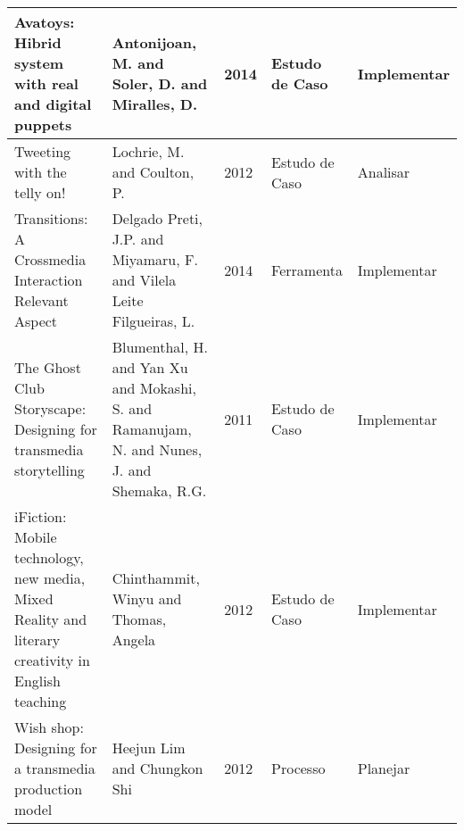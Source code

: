 \documentclass[
article,			%
11pt,				%
oneside,			%
a4paper,			%
english,			%
brazil,				%
sumario=tradicional
]{abntex2}
\begin{document}
\begin{anexosenv}
\begin{longtable}{p{6.0cm}|p{3.0cm}|p{.6cm}|p{2.0cm}|p{2.0cm}}
      \hline
      Avatoys: Hibrid system with real and digital puppets&Antonijoan, M. and Soler, D. and Miralles, D.&2014&Estudo de Caso & Implementar\\
      \hline
      Tweeting with the telly on!&Lochrie, M. and Coulton, P.&2012&Estudo de Caso & Analisar\\
      \hline
      Transitions: A Crossmedia Interaction Relevant Aspect&Delgado Preti, J.P. and Miyamaru, F. and Vilela Leite Filgueiras, L.&2014&Ferramenta & Implementar\\
      \hline
      The Ghost Club Storyscape: Designing for transmedia storytelling&Blumenthal, H. and Yan Xu and Mokashi, S. and Ramanujam, N. and Nunes, J. and Shemaka, R.G.&2011&Estudo de Caso & Implementar\\
      \hline
      iFiction: Mobile technology, new media, Mixed Reality and literary creativity in English teaching&Chinthammit, Winyu and Thomas, Angela&2012&Estudo de Caso & Implementar\\
      \hline
      Wish shop: Designing for a transmedia production model&Heejun Lim and Chungkon Shi&2012&Processo & Planejar\\
    \end{longtable}

  \end{anexosenv}
\end{document}
